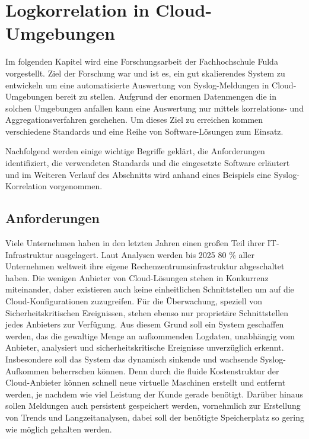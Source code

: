 \chapter{Logkorrelation in Cloud-Umgebungen}\label{02_jcorrelat}
\thispagestyle{fancy}

Im folgenden Kapitel wird eine Forschungsarbeit der Fachhochschule Fulda 
\cite{reissmann} vorgestellt. Ziel der Forschung war und ist es, ein gut skalierendes 
System zu entwickeln um eine automatisierte Auswertung von Syslog-Meldungen in 
Cloud-Umgebungen bereit zu stellen. Aufgrund der enormen Datenmengen die in solchen 
Umgebungen anfallen kann eine Auswertung nur mittels korrelations- und 
Aggregationsverfahren geschehen. Um dieses Ziel zu erreichen kommen verschiedene 
Standards und eine Reihe von Software-Lösungen zum Einsatz.

Nachfolgend werden einige wichtige Begriffe geklärt, die Anforderungen identifiziert, die 
verwendeten Standards und die eingesetzte Software erläutert und im Weiteren Verlauf des 
Abschnitts wird anhand eines Beispiels eine Syslog-Korrelation vorgenommen.

\section{Anforderungen}\label{anforderungen}

Viele Unternehmen haben in den letzten Jahren einen großen Teil ihrer IT-Infrastruktur 
ausgelagert. Laut Analysen werden bis 2025 80 \% aller Unternehmen \cite{web_ix} 
weltweit ihre eigene Rechenzentrumsinfrastruktur abgeschaltet haben. Die wenigen Anbieter 
von Cloud-Lösungen stehen in Konkurrenz miteinander, daher existieren auch keine 
einheitlichen Schnittstellen um auf die Cloud-Konfigurationen zuzugreifen. Für die 
Überwachung, speziell von Sicherheitskritischen Ereignissen, stehen ebenso nur 
proprietäre Schnittstellen jedes Anbieters zur Verfügung. Aus diesem Grund soll ein 
System geschaffen werden, das die gewaltige Menge an aufkommenden Logdaten, unabhängig 
vom Anbieter, analysiert und sicherheitskritische Ereignisse unverzüglich 
erkennt. Insbesondere soll das System das dynamisch sinkende und wachsende 
Syslog-Aufkommen beherrschen können. Denn durch die fluide Kostenstruktur der 
Cloud-Anbieter können schnell neue virtuelle Maschinen erstellt und entfernt werden, je 
nachdem wie viel Leistung der Kunde gerade benötigt.
Darüber hinaus sollen Meldungen auch persistent gespeichert werden, vornehmlich zur 
Erstellung von Trends und Langzeitanalysen, dabei soll der benötigte Speicherplatz so 
gering wie möglich gehalten werden.

